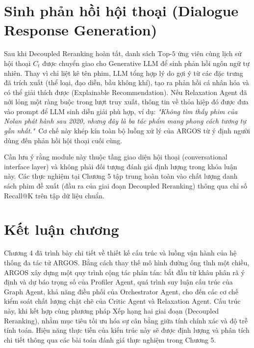 \section{Sinh phản hồi hội thoại (Dialogue Response Generation)}
Sau khi Decoupled Reranking hoàn tất, danh sách $\text{Top-}5$ ứng viên cùng lịch sử hội thoại $C_t$ được chuyển giao cho Generative LLM để sinh phản hồi ngôn ngữ tự nhiên. Thay vì chỉ liệt kê tên phim, LLM tổng hợp lý do gợi ý từ các đặc trưng đã trích xuất (thể loại, đạo diễn, bầu không khí), tạo ra phản hồi cá nhân hóa và có thể giải thích được (Explainable Recommendation). Nếu Relaxation Agent đã nới lỏng một ràng buộc trong lượt truy xuất, thông tin về thỏa hiệp đó được đưa vào prompt để LLM sinh diễn giải phù hợp, ví dụ: \textit{"Không tìm thấy phim của Nolan phát hành sau 2020, nhưng đây là ba tác phẩm mang phong cách tương tự gần nhất."}\ Cơ chế này khép kín toàn bộ luồng xử lý của ARGOS từ ý định người dùng đến phản hồi hội thoại cuối cùng.

Cần lưu ý rằng module này thuộc tầng giao diện hội thoại (conversational interface layer) và không phải đối tượng đánh giá định lượng trong khóa luận này. Các thực nghiệm tại Chương 5 tập trung hoàn toàn vào chất lượng danh sách phim đề xuất (đầu ra của giai đoạn Decoupled Reranking) thông qua chỉ số Recall@K trên tập dữ liệu chuẩn.

\section*{Kết luận chương}

Chương 4 đã trình bày chi tiết về thiết kế cấu trúc và luồng vận hành của hệ thống đa tác tử ARGOS. Bằng cách thay thế mô hình đường ống tĩnh một chiều, ARGOS xây dựng một quy trình cộng tác phân tán: bắt đầu từ khâu phân rã ý định và dự báo trọng số của Profiler Agent, quá trình suy luận cấu trúc của Graph Agent, khả năng điều phối của Orchestrator Agent, cho đến các cơ chế kiểm soát chất lượng chặt chẽ của Critic Agent và Relaxation Agent. Cấu trúc này, khi kết hợp cùng phương pháp Xếp hạng hai giai đoạn (Decoupled Reranking), nhằm mục tiêu tối ưu hóa sự cân bằng giữa tính chính xác và độ trễ tính toán. Hiệu năng thực tiễn của kiến trúc này sẽ được định lượng và phân tích chi tiết thông qua các bài toán đánh giá thực nghiệm trong Chương 5.